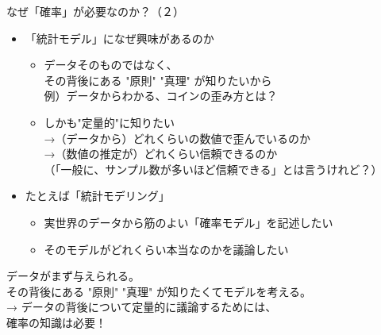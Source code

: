 \documentclass[dvipdfmx,cjk]{beamer}
\begin{document}
\begin{frame}{なぜ「確率」が必要なのか？（２）}


\begin{itemize}

    \item 「統計モデル」になぜ興味があるのか\pause
        \begin{itemize}
        \item データそのものではなく、\\その背後にある "原則" "真理" が知りたいから\\\pause
        例）データからわかる、コインの歪み方とは？\pause
        \item しかも"定量的"に知りたい\\ \pause
        →（データから）どれくらいの数値で歪んでいるのか\\ \pause
        →（数値の推定が）どれくらい信頼できるのか\\ \pause
        （「一般に、サンプル数が多いほど信頼できる」とは言うけれど？）
        \end{itemize}
        
    \pause
    \item たとえば「統計モデリング」 \pause
    \pause
        \begin{itemize}
        \item 実世界のデータから筋のよい「確率モデル」を記述したい
        \item そのモデルがどれくらい本当なのかを議論したい
        \end{itemize}

    \pause

\end{itemize}

データがまず与えられる。\\ \pause
その背後にある "原則" "真理" が知りたくてモデルを考える。\\ \pause
→ データの背後について定量的に議論するためには、\\
確率の知識は必要！

\end{frame}
\end{document}
